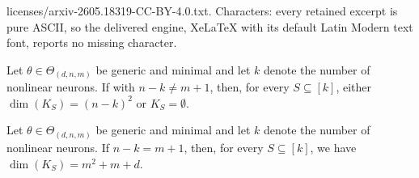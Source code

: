 \documentclass[10pt,a4paper]{amsart}
\newcommand{\paramspace}[1]{\Theta_{#1}}
\begin{document}
licenses/arxiv-2605.18319-CC-BY-4.0.txt. Characters: every retained excerpt is pure ASCII, so the delivered engine, XeLaTeX with its default Latin Modern text font, reports no missing character.
\begin{prop}
\label{prop:empty_or_dim}
Let $\theta \in \paramspace{(d,n,m)}$ be generic and minimal and let $k$ denote the number of nonlinear neurons. If with $n-k \neq m+1$, then, for every $S \subseteq [k]$, either $\dim(K_S) = (n-k)^2$ or $K_S=\emptyset$. 
\end{prop}

\begin{prop}
\label{prop:dim_special_case}
Let $\theta \in \paramspace{(d,n,m)}$ be generic and minimal and let $k$ denote the number of nonlinear neurons. If $n-k = m+1$, then, for every $S \subseteq [k]$, we have
$
\dim(K_S)= m^2 +m +d. 
$
\end{prop}
\end{document}

